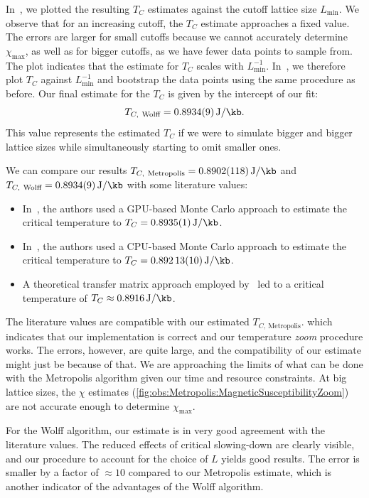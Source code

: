 		In~, we plotted the resulting $T_C$ estimates against the cutoff lattice size $L_\text{min}$. We observe that for an increasing cutoff, the $T_C$ estimate approaches a fixed value. The errors are larger for small cutoffs because we cannot accurately determine $\chi_\text{max}$, as well as for bigger cutoffs, as we have fewer data points to sample from. The plot indicates that the estimate for $T_C$ scales with $L_\text{min}^{-1}$. In~, we therefore plot $T_C$ against $L_\text{min}^{-1}$ and bootstrap the data points using the same procedure as before. Our final estimate for the $T_C$ is given by the intercept of our fit:
		\begin{equation}
			T_{C,~\text{Wolff}} = \SI{0.8934(9)}{\J\per\kb}.
		\end{equation}
		This value represents the estimated $T_C$ if we were to simulate bigger and bigger lattice sizes while simultaneously starting to omit smaller ones.
		
		We can compare our results $T_{C,~\text{Metropolis}} = \SI{0.8902(118)}{\J\per\kb}$ and $T_{C,~\text{Wolff}} = \SI{0.8934(9)}{\J\per\kb}$ with some literature values:
		\begin{itemize}
			\item In~\citet{literature_gpu}, the authors used a GPU-based Monte Carlo approach to estimate the critical temperature to $T_C=\SI{0.8935(1)}{\J\per\kb}$.
			\item In~\citet{literature_cpu}, the authors used a CPU-based Monte Carlo approach to estimate the critical temperature to $T_C=\SI{0.89213(10)}{\J\per\kb}$.
			\item A theoretical transfer matrix approach employed by~\cite{literature_theo} led to a critical temperature of $T_C \approx \SI{0.8916}{\J\per\kb}$.
		\end{itemize}
		
		The literature values are compatible with our estimated $T_{C,~\text{Metropolis}}$. which indicates that our implementation is correct and our temperature \emph{zoom} procedure works. The errors, however, are quite large, and the compatibility of our estimate might just be because of that. We are approaching the limits of what can be done with the Metropolis algorithm given our time and resource constraints. At big lattice sizes, the $\chi$ estimates (\cref{fig:obs:Metropolis:MagneticSusceptibilityZoom}) are not accurate enough to determine $\chi_\text{max}$. 
		
		For the Wolff algorithm, our estimate is in very good agreement with the literature values. The reduced effects of critical slowing-down are clearly visible, and our procedure to account for the choice of $L$ yields good results. The error is smaller by a factor of $\approx 10$ compared to our Metropolis estimate, which is another indicator of the advantages of the Wolff algorithm.
